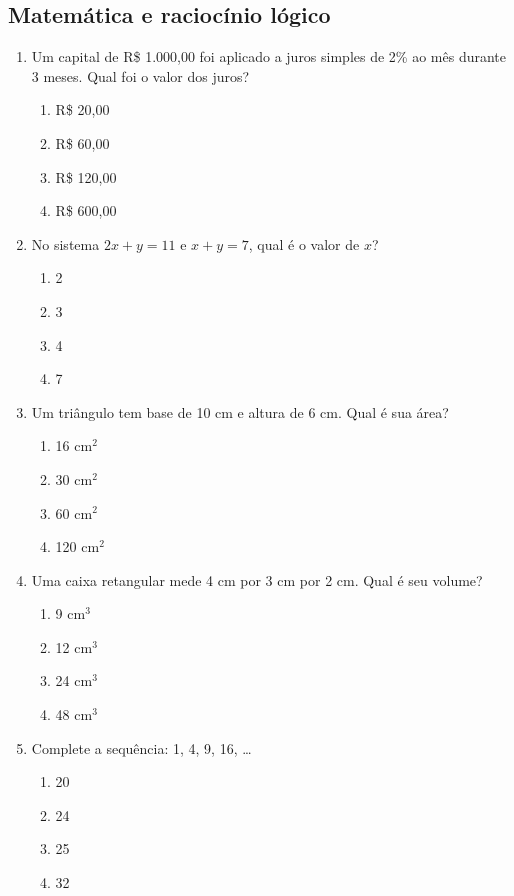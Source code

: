 \documentclass[12pt,a4paper]{article}
\begin{document}
\subsection*{Matemática e raciocínio lógico}
\begin{enumerate}[resume]
  \item Um capital de R\$ 1.000,00 foi aplicado a juros simples de 2\% ao mês durante 3 meses. Qual foi o valor dos juros?
  \begin{enumerate}[label=\alph*)]
    \item R\$ 20,00
    \item R\$ 60,00
    \item R\$ 120,00
    \item R\$ 600,00
  \end{enumerate}

  \item No sistema $2x+y=11$ e $x+y=7$, qual é o valor de $x$?
  \begin{enumerate}[label=\alph*)]
    \item 2
    \item 3
    \item 4
    \item 7
  \end{enumerate}

  \item Um triângulo tem base de 10 cm e altura de 6 cm. Qual é sua área?
  \begin{enumerate}[label=\alph*)]
    \item 16 cm$^2$
    \item 30 cm$^2$
    \item 60 cm$^2$
    \item 120 cm$^2$
  \end{enumerate}

  \item Uma caixa retangular mede 4 cm por 3 cm por 2 cm. Qual é seu volume?
  \begin{enumerate}[label=\alph*)]
    \item 9 cm$^3$
    \item 12 cm$^3$
    \item 24 cm$^3$
    \item 48 cm$^3$
  \end{enumerate}

  \item Complete a sequência: 1, 4, 9, 16, \ldots
  \begin{enumerate}[label=\alph*)]
    \item 20
    \item 24
    \item 25
    \item 32
  \end{enumerate}
\end{enumerate}
\end{document}
